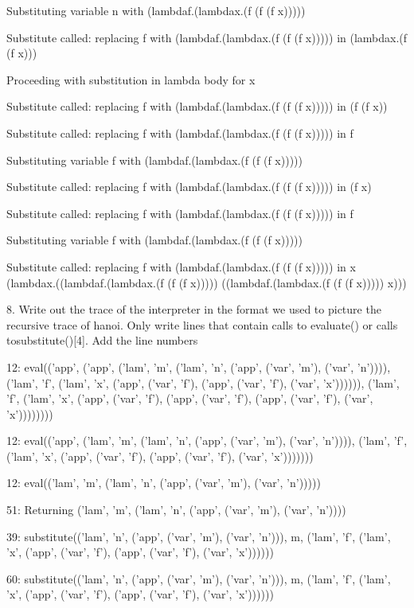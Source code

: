 \documentclass{article}
\theoremstyle{theorem}
\theoremstyle{definition}
\theoremstyle{remark}
\begin{document}
Substituting variable n with (lambdaf.(lambdax.(f (f (f x)))))

Substitute called: replacing f with (lambdaf.(lambdax.(f (f (f x))))) in (lambdax.(f (f x)))

Proceeding with substitution in lambda body for x

Substitute called: replacing f with (lambdaf.(lambdax.(f (f (f x))))) in (f (f x))

Substitute called: replacing f with (lambdaf.(lambdax.(f (f (f x))))) in f

Substituting variable f with (lambdaf.(lambdax.(f (f (f x)))))

Substitute called: replacing f with (lambdaf.(lambdax.(f (f (f x))))) in (f x)

Substitute called: replacing f with (lambdaf.(lambdax.(f (f (f x))))) in f

Substituting variable f with (lambdaf.(lambdax.(f (f (f x)))))

Substitute called: replacing f with (lambdaf.(lambdax.(f (f (f x))))) in x
(lambdax.((lambdaf.(lambdax.(f (f (f x))))) ((lambdaf.(lambdax.(f (f (f x))))) x)))

8. Write out the trace of the interpreter in the format we used to picture the recursive trace of hanoi. Only write lines that contain calls to evaluate() or calls tosubstitute()[4]. Add the line numbers

12: eval(('app', ('app', ('lam', 'm', ('lam', 'n', ('app', ('var', 'm'), ('var', 'n')))), ('lam', 'f', ('lam', 'x', ('app', ('var', 'f'), ('app', ('var', 'f'), ('var', 'x')))))), ('lam', 'f', ('lam', 'x', ('app', ('var', 'f'), ('app', ('var', 'f'), ('app', ('var', 'f'), ('var', 'x'))))))))

12: eval(('app', ('lam', 'm', ('lam', 'n', ('app', ('var', 'm'), ('var', 'n')))), ('lam', 'f', ('lam', 'x', ('app', ('var', 'f'), ('app', ('var', 'f'), ('var', 'x')))))))

12: eval(('lam', 'm', ('lam', 'n', ('app', ('var', 'm'), ('var', 'n')))))

51: Returning ('lam', 'm', ('lam', 'n', ('app', ('var', 'm'), ('var', 'n'))))

39: substitute(('lam', 'n', ('app', ('var', 'm'), ('var', 'n'))), m, ('lam', 'f', ('lam', 'x', ('app', ('var', 'f'), ('app', ('var', 'f'), ('var', 'x'))))))

60: substitute(('lam', 'n', ('app', ('var', 'm'), ('var', 'n'))), m, ('lam', 'f', ('lam', 'x', ('app', ('var', 'f'), ('app', ('var', 'f'), ('var', 'x'))))))
\end{document}
